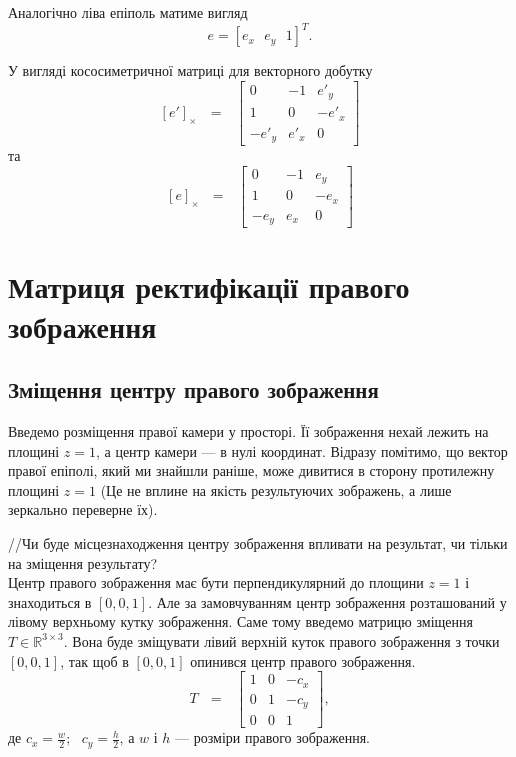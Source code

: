 Аналогічно ліва епіполь матиме вигляд
\begin{equation}
e = {[e_x \:\:\: e_y \:\:\: 1]}^T.
\end{equation}

У вигляді кососиметричної матриці для векторного добутку
\begin{equation}
{[e']}_\times \:\:\: = \:\:\:
\left[
\begin{matrix}
0 & -1 & {e'}_y\\
1 & 0 & -{e'}_x\\
-{e'}_y & {e'}_x & 0\
\end{matrix}
\right]
\end{equation}
та
\begin{equation}
{[e]}_\times \:\:\: = \:\:\:
\left[
\begin{matrix}
0 & -1 & {e}_y\\
1 & 0 & -{e}_x\\
-{e}_y & {e}_x & 0\
\end{matrix}
\right]
\end{equation} 



\section{Матриця ректифікації правого зображення}
\subsection{Зміщення центру правого зображення}
Введемо розміщення правої камери у просторі. Її зображення нехай лежить на
площині $z=1$, а центр камери --- в нулі координат. Відразу помітимо, що вектор
правої епіполі, який ми знайшли раніше, може дивитися в сторону протилежну 
площині $z=1$ (Це не вплине на якість результуючих зображень, а лише зеркально 
переверне їх).

//Чи буде місцезнаходження центру зображення впливати на результат, чи тільки на
зміщення результату?\\
Центр правого зображення має бути перпендикулярний до площини $z=1$ і 
знаходиться в $[0, 0, 1]$. Але за замовчуванням центр зображення розташований 
у лівому верхньому кутку зображення. Саме тому введемо матрицю зміщення 
$T \in \mathbb{R}^{3\times3}$. Вона буде зміщувати лівий верхній куток 
правого зображення з точки $[0, 0, 1]$, так щоб в $[0, 0, 1]$ опинився 
центр правого зображення.
\begin{equation}
T \:\:\: = \:\:\:\left[
\begin{matrix}
1 & 0 & -c_x\\
0 & 1 & -c_y\\
0 & 0 & 1\
\end{matrix}
\right],
\end{equation}
де $c_x = \frac{w}{2}; \:\:\: c_y = \frac{h}{2}$, а $w$ і $h$ --- розміри 
правого зображення.

